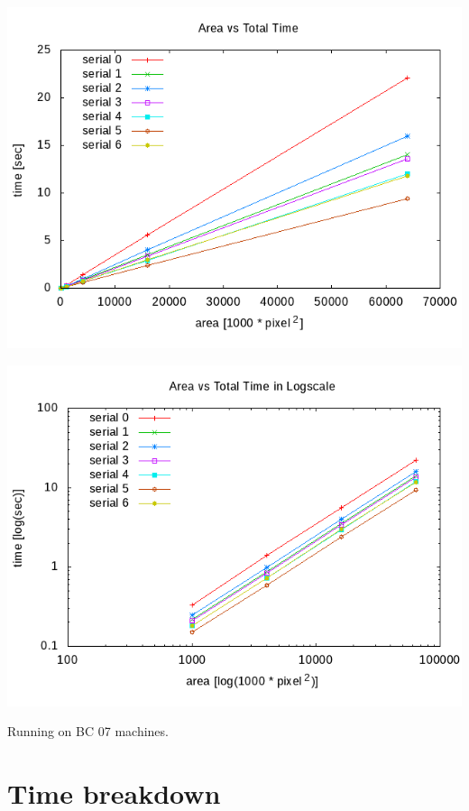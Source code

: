 \documentclass[12pt]{article}
\begin{document}
\begin{center}
    \begin{minipage}[b]{0.45\linewidth}
        \includegraphics[width=\textwidth]{../../plots/areatime_total_linear.png}
    \end{minipage}
    \begin{minipage}[b]{0.45\linewidth}
        \includegraphics[width=\textwidth]{../../plots/areatime_total_log.png}
    \end{minipage}
\end{center}

\small Running on BC 07 machines.

\section{Time breakdown}
\end{document}
